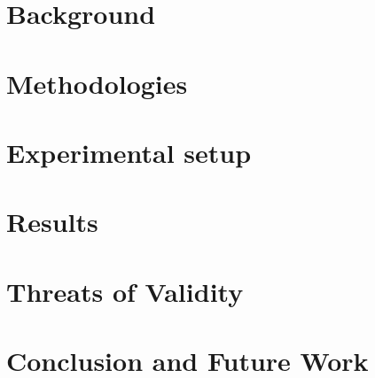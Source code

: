 \documentclass[conference,10pt]{IEEEtran}
\begin{document}
\section{Background}
\label{sec:background}



\section{Methodologies}
\label{sec:method}




\section{Experimental setup}
\label{sec:experiments}





\section{Results}
\label{sec:results}






\section{Threats of Validity}
\label{sec:threats}





\section{Conclusion and Future Work}
\label{sec:conclusion}

% 


\balance


\end{document}
